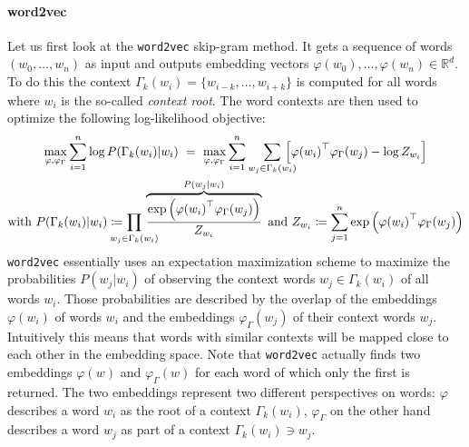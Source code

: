 \paragraph{word2vec}
Let us first look at the \texttt{word2vec} skip-gram method.
It gets a sequence of words $(w_0, \dots, w_n)$ as input and outputs embedding vectors $\varphi(w_0), \dots, \varphi(w_n) \in \mathbb{R}^d$.
To do this the context $\Gamma_k(w_i) = \{ w_{i-k}, \dots, w_{i + k} \}$ is computed for all words where $w_i$ is the so-called \textit{context root}.
The word contexts are then used to optimize the following log-likelihood objective:
\begin{gather}
	\max_{\varphi, \varphi_{\Gamma}} \sum_{i = 1}^n \log P(\Gamma_k(w_i) | w_i)\ =\ \max_{\varphi, \varphi_{\Gamma}} \sum_{i = 1}^n \smashoperator[r]{\sum_{w_j \in \Gamma_k(w_i)}}\, \left[ {\varphi(w_i)}^\top \varphi_{\Gamma}(w_j) - \log Z_{w_i} \right] \label{eq:related:word2vec}\\
	\text{with } P(\Gamma_k(w_i) | w_i) \coloneqq \prod_{\mathclap{w_j \in \Gamma_k(w_i)}}\, \overbrace{\frac{\exp\left({\varphi(w_i)}^\top \varphi_{\Gamma}(w_j)\right)}{Z_{w_i}}}^{P(w_j | w_i)}
	\text{ and } Z_{w_i} \coloneqq \sum_{j = 1}^n \exp\left({\varphi(w_i)}^\top \varphi_{\Gamma}(w_j)\right) \nonumber
\end{gather}
\texttt{word2vec} essentially uses an expectation maximization scheme to maximize the probabilities $P(w_j | w_i)$ of observing the context words $w_j \in \Gamma_k(w_i)$ of all words $w_i$.
Those probabilities are described by the overlap of the embeddings $\varphi(w_i)$ of words $w_i$ and the embeddings $\varphi_{\Gamma}(w_j)$ of their context words $w_j$.
Intuitively this means that words with similar contexts will be mapped close to each other in the embedding space.
Note that \texttt{word2vec} actually finds two embeddings $\varphi(w)$ and $\varphi_{\Gamma}(w)$ for each word of which only the first is returned.
The two embeddings represent two different perspectives on words: $\varphi$ describes a word $w_i$ as the root of a context $\Gamma_k(w_i)$, $\varphi_{\Gamma}$ on the other hand describes a word $w_j$ as part of a context $\Gamma_k(w_i) \ni w_j$.

